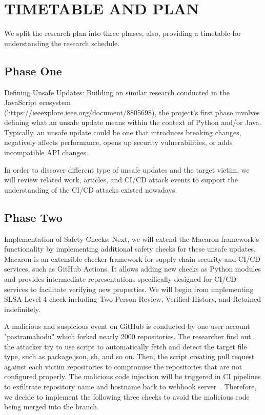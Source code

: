 \section{TIMETABLE AND PLAN}
We split the research plan into three phases, also, providing a timetable for understanding 
the research schedule.

\subsection{Phase One}
Defining Unsafe Updates: Building on similar research conducted in the JavaScript ecosystem 
\\(https://ieeexplore.ieee.org/document/8805698), the project's first phase 
involves defining what an unsafe update means within the context of Python and/or Java. 
Typically, an unsafe update could be one that introduces breaking changes, 
negatively affects performance, opens up security vulnerabilities, 
or adds incompatible API changes.

In order to discover different type of unsafe updates and the target victim, we will review 
related work, articles, and CI/CD attack events to support the understanding of the CI/CD 
attacks existed nowadays. 

\subsection{Phase Two}
Implementation of Safety Checks: Next, we will extend the Macaron framework's 
functionality by implementing additional safety checks for these unsafe updates.
Macaron is an extensible checker framework for supply chain security and CI/CD services,
such as GitHub Actions. It allows adding new checks as Python modules and provides 
intermediate representations specifically designed for CI/CD services to facilitate 
verifying new properties. We will begin from implementing SLSA Level 4 check including Two 
Person Review, Verified History, and Retained indefinitely.

A malicious and suspicious event on GitHub is conducted by one user account "pastramahodu"
which forked nearly 2000 repositories. The researcher find out the attacker try to use script
to automatically fetch and detect the target file type, such as package.json, sh, and so on.
Then, the script creating pull request against each victim repositories to compromise the 
repositories that are not configured properly. The malicious code injection will be triggered
in CI pipelines to exfiltrate repository name and hostname back to webhook server~\cite{gelb2023mass}.
Therefore, we decide to implement the following three checks to avoid the malicious code being 
merged into the branch.

